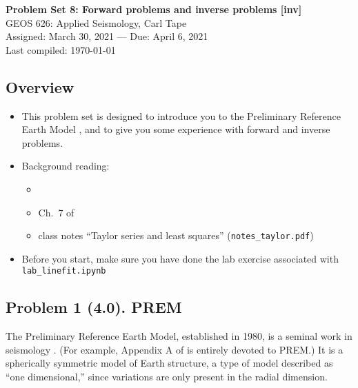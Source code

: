 \documentclass[11pt,titlepage,fleqn]{article}
\begin{document}

\begin{spacing}{1.2}
\centering
{\large \bf Problem Set 8: Forward problems and inverse problems [inv]} \\
GEOS 626: Applied Seismology, Carl Tape \\
Assigned: March 30, 2021 --- Due: April 6, 2021 \\
Last compiled: \today
\end{spacing}


\subsection*{Overview}

\begin{itemize}
\item This problem set is designed to introduce you to the Preliminary Reference Earth Model \citep{PREM}, and to give you some experience with forward and inverse problems.

\item Background reading:
%
\begin{itemize}
\item \citet{PREM}
\item Ch.~7 of \citet{SteinWysession}
\item class notes ``Taylor series and least squares'' (\verb+notes_taylor.pdf+)
\end{itemize}


\item Before you start, make sure you have done the lab exercise associated with \verb+lab_linefit.ipynb+

\end{itemize}


\subsection*{Problem 1 (4.0). PREM}

The Preliminary Reference Earth Model, established in 1980, is a seminal work in seismology \citep{PREM}. (For example, Appendix A of \citet{ShearerE2} is entirely devoted to PREM.) It is a spherically symmetric model of Earth structure, a type of model described as ``one dimensional,'' since variations are only present in the radial dimension.
\end{document}
